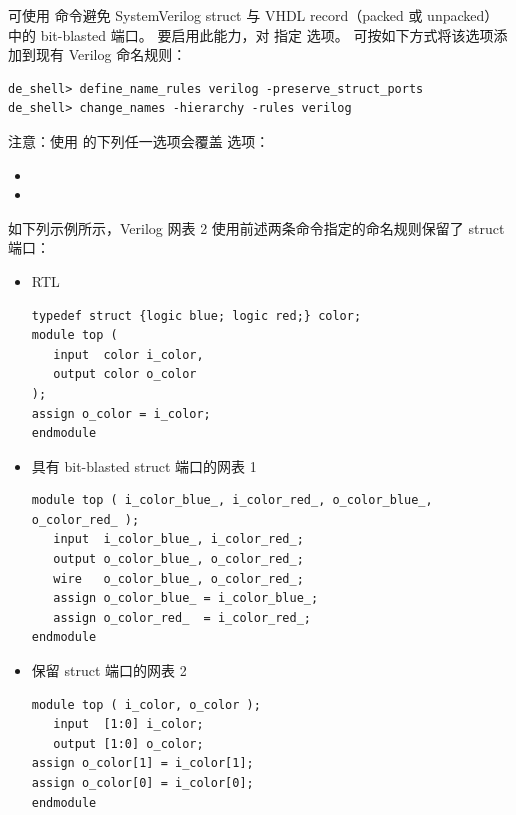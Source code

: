 可使用  命令避免 SystemVerilog struct 与 VHDL record（packed 或 unpacked）中的 bit-blasted 端口。
要启用此能力，对  指定  选项。
可按如下方式将该选项添加到现有 Verilog 命名规则：
\begin{lstlisting}
de_shell> define_name_rules verilog -preserve_struct_ports
de_shell> change_names -hierarchy -rules verilog
\end{lstlisting}

注意：使用  的下列任一选项会覆盖  选项：
\begin{itemize}
  \item {}
  \item {}
\end{itemize}

如下列示例所示，Verilog 网表 2 使用前述两条命令指定的命名规则保留了 struct 端口：
\begin{itemize}
  \item RTL
\begin{lstlisting}
typedef struct {logic blue; logic red;} color;
module top (
   input  color i_color,
   output color o_color
);
assign o_color = i_color;
endmodule
\end{lstlisting}
  \item 具有 bit-blasted struct 端口的网表 1
\begin{lstlisting}
module top ( i_color_blue_, i_color_red_, o_color_blue_,
o_color_red_ );
   input  i_color_blue_, i_color_red_;
   output o_color_blue_, o_color_red_;
   wire   o_color_blue_, o_color_red_;
   assign o_color_blue_ = i_color_blue_;
   assign o_color_red_  = i_color_red_;
endmodule
\end{lstlisting}
  \item 保留 struct 端口的网表 2
\begin{lstlisting}
module top ( i_color, o_color );
   input  [1:0] i_color;
   output [1:0] o_color;
assign o_color[1] = i_color[1];
assign o_color[0] = i_color[0];
endmodule
\end{lstlisting}
\end{itemize}
